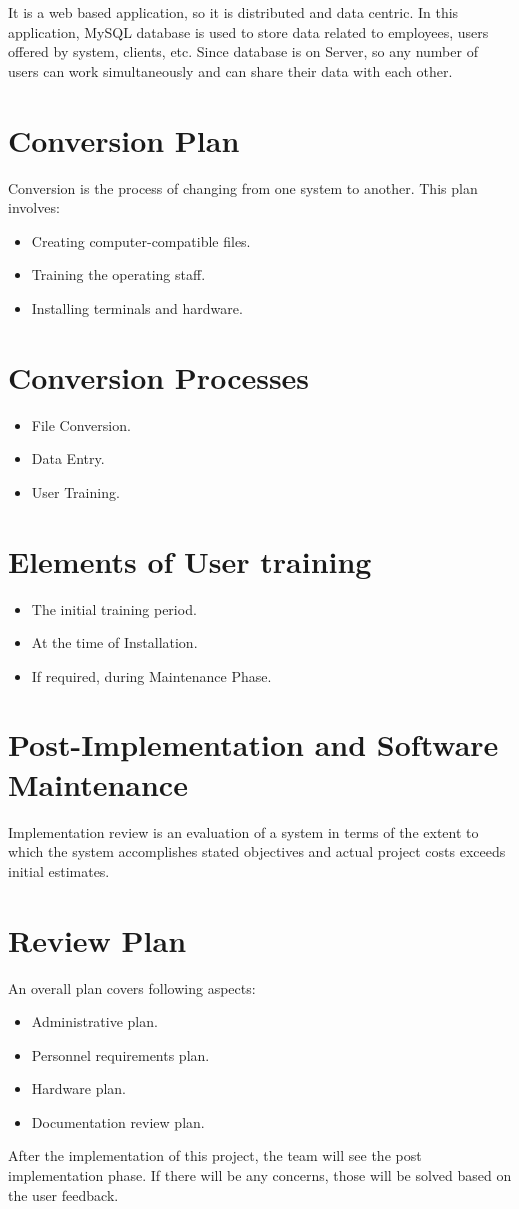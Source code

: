 It is a web based application, so it is distributed and data centric. 
In this application, MySQL database is used to store data related to 
employees, users offered by system, clients, etc. Since database is on 
Server, so any number of users can work simultaneously and can share 
their data with each other.
\section{Conversion Plan}
Conversion is the process of changing from one system to another. This 
plan involves:
\begin{itemize}
\item Creating computer-compatible files.
\item Training the operating staff.
\item Installing terminals and hardware.
\end{itemize}

\section{Conversion Processes}
\begin{itemize}
\item File Conversion.
\item  Data Entry.
\item User Training.
\end{itemize}
\vskip 0.5cm
\section{Elements of User training}
\begin{itemize}
\item The initial training period.
\item At the time of Installation.
\item If required, during Maintenance Phase.
\end{itemize}

\section{Post-Implementation and Software Maintenance}
Implementation review is an evaluation of a system in terms of the 
extent to which the system accomplishes stated objectives and actual 
project costs exceeds initial estimates.
\section{Review Plan}
An overall plan covers following aspects:
\begin{itemize}
\item Administrative plan.
\item Personnel requirements plan.
\item Hardware plan.
\item Documentation review plan.
\end{itemize}
\vskip 0.5cm
After the implementation of this project, the team will see the post 
implementation phase. If there will be any concerns, those will be 
solved based on the user feedback.
